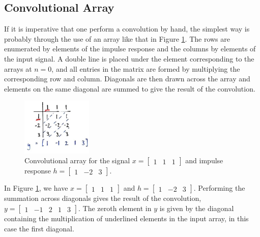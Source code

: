 \subsection{Convolutional Array}
%
If it is imperative that one perform a convolution by hand, the simplest
way is probably through the use of an array like that in Figure
\ref{fig::lecture_3_convolution_grid_one}. The rows are enumerated by elements
of the impulse response and the columns by elements of the input signal.
A double line is placed under the element corresponding to the arrays
at $n=0$, and all entries in the matrix are formed by multiplying the
corresponding row and column. Diagonals are then drawn across the array
and elements on the same diagonal are summed to give the result of the
convolution.
%
\begin{figure}[!htb]
  \includegraphics[width=0.3\textwidth]{images/lecture_3_convolution_grid_one.JPG}
  \caption{
    Convolutional array for the signal
    $x = \left[\begin{array}{ccc} 1 & 1 & 1\end{array}\right]$ and
    impulse response
    $h = \left[\begin{array}{ccc} 1 & -2 & 3\end{array}\right]$.
  }
  \label{fig::lecture_3_convolution_grid_one}
\end{figure}
%
In Figure \ref{fig::lecture_3_convolution_grid_one}, we have
$x = \left[\begin{array}{ccc} 1 & 1 & 1\end{array}\right]$ and
$h = \left[\begin{array}{ccc} 1 & -2 & 3\end{array}\right]$. Performing the
summation across diagonals gives the result of the convolution,
$y = \left[\begin{array}{ccccc} 1 & -1 & 2 & 1 & 3\end{array}\right]$. The
zeroth element in $y$ is given by the diagonal containing the multiplication
of underlined elements in the input array, in this case the first diagonal.

